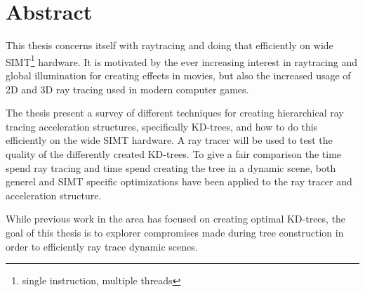 

\section*{Abstract}

This thesis concerns itself with raytracing and doing that efficiently
on wide SIMT\footnote{single instruction, multiple threads}
hardware. It is motivated by the ever increasing interest in
raytracing and global illumination for creating effects in movies, but
also the increased usage of 2D and 3D ray tracing used in modern
computer games.

The thesis present a survey of different techniques for creating
hierarchical ray tracing acceleration structures, specifically
KD-trees, and how to do this efficiently on the wide SIMT hardware. A
ray tracer will be used to test the quality of the differently created
KD-trees. To give a fair comparison the time spend ray tracing
and time spend creating the tree in a dynamic scene, both
generel and SIMT specific optimizations have been applied to the ray
tracer and acceleration structure.

While previous work in the area has focused on creating optimal
KD-trees, the goal of this thesis is to explorer compromises made
during tree construction in order to efficiently ray trace dynamic
scenes.










